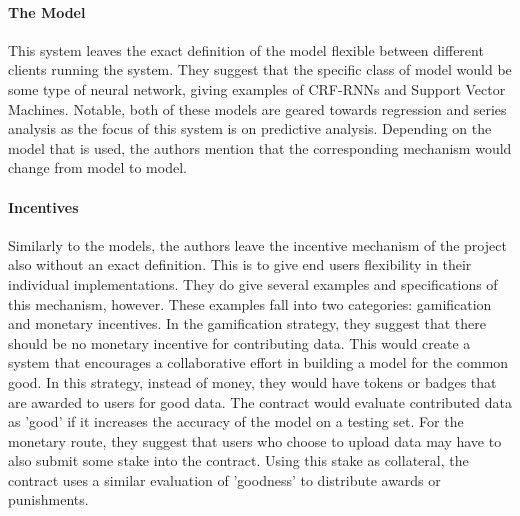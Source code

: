 \documentclass{article}
\begin{document}
    \paragraph{The Model}
    This system leaves the exact definition of the model flexible between different clients running the system.  They
    suggest that the specific class of model would be some type of neural network, giving examples of CRF-RNNs and
    Support Vector Machines.  Notable, both of these models are geared towards regression and series analysis as the
    focus of this system is on predictive analysis.  Depending on the model that is used, the authors mention that the
    corresponding mechanism would change from model to model.

    \paragraph{Incentives}
    Similarly to the models, the authors leave the incentive mechanism of the project also without an exact definition.
    This is to give end users flexibility in their individual implementations.  They do give several examples and
    specifications of this mechanism, however.  These examples fall into two categories: gamification and monetary
    incentives.  In the gamification strategy, they suggest that there should be no monetary incentive for contributing
    data.  This would create a system that encourages a collaborative effort in building a model for the common good.
    In this strategy, instead of money, they would have tokens or badges that are awarded to users for good data.  The
    contract would evaluate contributed data as 'good' if it increases the accuracy of the model on a testing set.
    For the monetary route, they suggest that users who choose to upload data may have to also submit some stake into
    the contract.  Using this stake as collateral, the contract uses a similar evaluation of 'goodness' to distribute
    awards or punishments.
\end{document}
